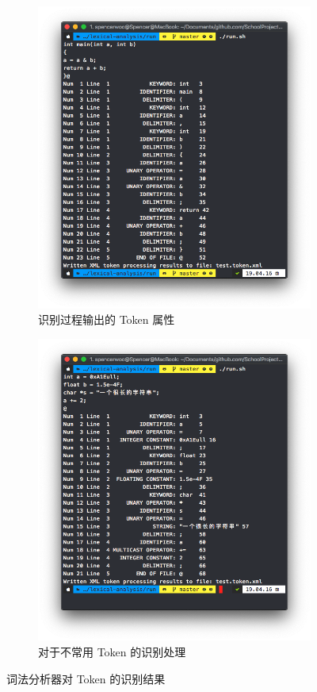 \documentclass[UTF8]{ctexart}
\begin{document}
\begin{figure}[h]
  \begin{subfigure}{0.49\textwidth}
    \includegraphics[width=\linewidth]{images/output.png}
    \caption{识别过程输出的 Token 属性}
    \label{fig:subfig1}
  \end{subfigure}
  \begin{subfigure}{0.49\textwidth}
    \includegraphics[width=\linewidth]{images/output2.png}
    \caption{对于不常用 Token 的识别处理}
    \label{fig:subfig2}
  \end{subfigure}
  \caption{词法分析器对 Token 的识别结果}
  \label{fig:figure5}
\end{figure}
\end{document}
